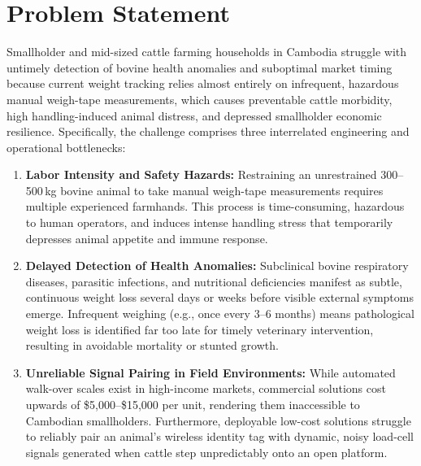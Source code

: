 \documentclass[11pt,a4paper]{report}
\begin{document}
\section{Problem Statement}
Smallholder and mid-sized cattle farming households in Cambodia struggle with untimely detection of bovine health anomalies and suboptimal market timing because current weight tracking relies almost entirely on infrequent, hazardous manual weigh-tape measurements, which causes preventable cattle morbidity, high handling-induced animal distress, and depressed smallholder economic resilience. Specifically, the challenge comprises three interrelated engineering and operational bottlenecks:
\begin{enumerate}
    \item \textbf{Labor Intensity and Safety Hazards:} Restraining an unrestrained 300--500\,kg bovine animal to take manual weigh-tape measurements requires multiple experienced farmhands. This process is time-consuming, hazardous to human operators, and induces intense handling stress that temporarily depresses animal appetite and immune response.
    \item \textbf{Delayed Detection of Health Anomalies:} Subclinical bovine respiratory diseases, parasitic infections, and nutritional deficiencies manifest as subtle, continuous weight loss several days or weeks before visible external symptoms emerge. Infrequent weighing (e.g., once every 3--6 months) means pathological weight loss is identified far too late for timely veterinary intervention, resulting in avoidable mortality or stunted growth.
    \item \textbf{Unreliable Signal Pairing in Field Environments:} While automated walk-over scales exist in high-income markets, commercial solutions cost upwards of \$5,000--\$15,000 per unit, rendering them inaccessible to Cambodian smallholders. Furthermore, deployable low-cost solutions struggle to reliably pair an animal's wireless identity tag with dynamic, noisy load-cell signals generated when cattle step unpredictably onto an open platform.
\end{enumerate}
\end{document}
